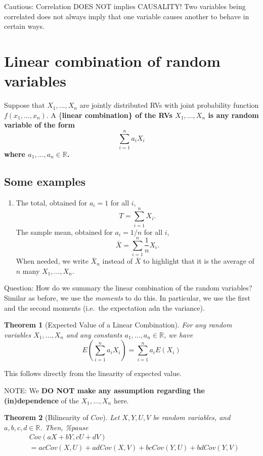 \documentclass[
]{book}
\providecommand{\tightlist}{%
  \setlength{\itemsep}{0pt}\setlength{\parskip}{0pt}}
\newtheorem{theorem}{Theorem}[chapter]
\theoremstyle{definition}
\theoremstyle{definition}
\theoremstyle{definition}
\theoremstyle{definition}
\theoremstyle{remark}
\begin{document}
Cautious: Correlation DOES NOT implies CAUSALITY! Two variables being correlated does not always imply that one variable causes another to behave in certain ways.

\section{Linear combination of random variables}\label{linear-combination-of-random-variables}

Suppose that \(X_1,...,X_n\) are jointly distributed RVs with joint probability function \(f(x_1,...,x_n)\). A \{\bf linear combination\} of the RVs \(X_1,...,X_n\) is any random variable of the form
\[
\sum_{i=1}^{n} a_i X_i
\]
where \(a_1,...,a_n \in \mathbb{R}\).

\subsection{Some examples}\label{some-examples}

\begin{enumerate}
\def\labelenumi{\alph{enumi}.}
\tightlist
\item
  The total, obtained for \(a_i=1\) for all \(i\),
  \[
    T = \sum_{i=1}^{n} X_i .
  \]
  The sample mean, obtained for \(a_i=1/n\) for all \(i\),
  \[
    \bar{X} = \sum_{i=1}^{n} \frac{1}{n} X_i .
  \]
  When needed, we write \(\bar{X}_n\) instead of \(\bar{X}\) to highlight that it is the average of \(n\) many \(X_1,\dots,X_n\).
\end{enumerate}

Question: How do we summary the linear combination of the random variables? Similar as before, we use the \emph{moments} to do this. In particular, we use the first and the second moments (i.e.~the expectation adn the variance).

\begin{theorem}[Expected Value of a Linear Combination]
For any random variables \(X_1,\dots,X_n\) and any constants \(a_1,\dots,a_n\in\mathbb{R}\), we have
\[
E \left( \sum_{i=1}^{n} a_i X_i  \right) = \sum_{i=1}^{n} a_i E(X_i)
\]
\end{theorem}

This follows directly from the linearity of expected value.

NOTE: We \textbf{DO NOT make any assumption regarding the (in)dependence} of the \(X_1,\dots,X_n\) here.

\begin{theorem}[Bilinearity of $Cov$]
Let \(X, Y, U, V\) be random variables, and \(a, b, c, d \in \mathbb{R}\). Then,
\%pause
\begin{align*}
    &Cov(aX + bY, cU + dV)\\ 
    &= acCov(X,U) + adCov(X,V) + bcCov(Y,U) + bdCov(Y,V)
\end{align*}
\end{theorem}
\end{document}
